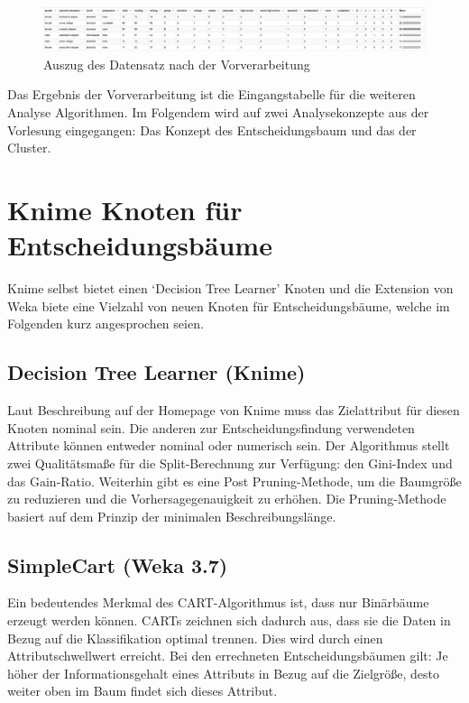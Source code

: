 \documentclass[12pt,					%
							 oneside,			%
							 a4paper,			%
							 halfparskip,		%
							 liststotoc,			%
							 bibtotoc,			%
							 fleqn,				%
							 pointlessnumbers]	%
							 {scrreprt}
\begin{document}
	\begin{figure}[!h]
		\includegraphics[scale=0.47]{pictures/processed.png}
		\caption{Auszug des Datensatz nach der Vorverarbeitung}
	\end{figure}
	
	Das Ergebnis der Vorverarbeitung ist die Eingangstabelle für die weiteren Analyse Algorithmen. Im Folgendem wird auf zwei Analysekonzepte aus der Vorlesung eingegangen: Das Konzept des Entscheidungsbaum und das der Cluster.
	
	\section{Knime Knoten für Entscheidungsbäume}\label{tree:dec:nodes}
		Knime selbst bietet einen `Decision Tree Learner' Knoten und die Extension von Weka biete eine Vielzahl von neuen Knoten für Entscheidungsbäume, welche im Folgenden kurz angesprochen seien.
	
		\subsection{Decision Tree Learner (Knime)}
			Laut Beschreibung auf der Homepage von Knime muss das Zielattribut für diesen Knoten nominal sein. Die anderen zur Entscheidungsfindung verwendeten Attribute können entweder nominal oder numerisch sein. Der Algorithmus stellt zwei Qualitätsmaße für die Split-Berechnung zur Verfügung: den Gini-Index und das Gain-Ratio. Weiterhin gibt es eine Post Pruning-Methode, um die Baumgröße zu reduzieren und die Vorhersagegenauigkeit zu erhöhen. Die Pruning-Methode basiert auf dem Prinzip der minimalen Beschreibungslänge.\cite{DecTreeLearner}
		
		\subsection{SimpleCart (Weka 3.7)}
			Ein bedeutendes Merkmal des CART-Algorithmus ist, dass nur Binärbäume erzeugt werden können. CARTs zeichnen sich dadurch aus, dass sie die Daten in Bezug auf die Klassifikation optimal trennen. Dies wird durch einen Attributschwellwert erreicht. Bei den errechneten Entscheidungsbäumen gilt: Je höher der Informationsgehalt eines Attributs in Bezug auf die Zielgröße, desto weiter oben im Baum findet sich dieses Attribut.\cite{Breiman1983}
			
\end{document}
